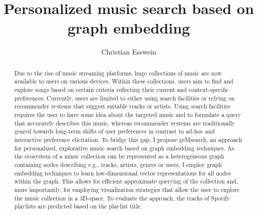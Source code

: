 \documentclass[sigconf]{acmart}
\begin{document}
\title{Personalized music search based on graph embedding}


\author{Christian Esswein}



\begin{abstract}
	
	Due to the rise of music streaming platforms, huge collections of music are now available to users on various devices. Within these collections, users aim to find and explore songs based on certain criteria reflecting their current and context-specific preferences. Currently, users are limited to either using search facilities or relying on recommender systems that suggest suitable tracks or artists. Using search facilities requires the user to have some idea about the targeted music and to formulate a query that accurately describes this music, whereas recommender systems are traditionally geared towards long-term shifts of user preferences in contrast to ad-hoc and interactive preference elicitation. To bridge this gap, I propose geMsearch, an approach for personalized, explorative music search based on graph embedding techniques. As the ecosystem of a music collection can be represented as a heterogeneous graph containing nodes describing e.g., tracks, artists, genres or users, I employ graph embedding techniques to learn low-dimensional vector representations for all nodes within the graph. This allows for efficient approximate querying of the collection and, more importantly, for employing visualization strategies that allow the user to explore the music collection in a 3D-space. To evaluate the approach, the tracks of Spotify playlists are predicted based on the playlist title.
	
\end{abstract}
\end{document}
